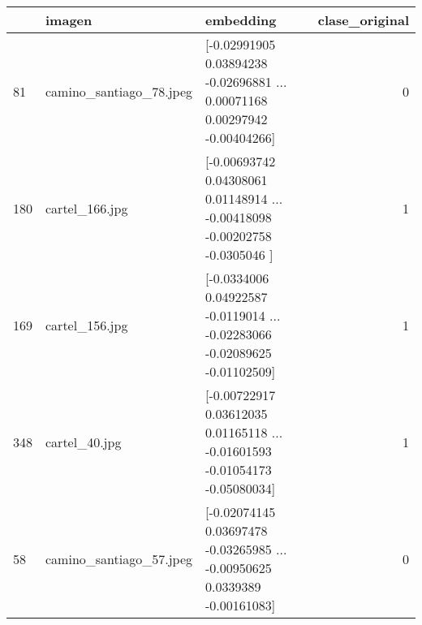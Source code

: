 \begin{tabular}{lllr}
\toprule
 & imagen & embedding & clase\_original \\
\midrule
81 & camino\_santiago\_78.jpeg & [-0.02991905  0.03894238 -0.02696881 ...  0.00071168  0.00297942
 -0.00404266] & 0 \\
180 & cartel\_166.jpg & [-0.00693742  0.04308061  0.01148914 ... -0.00418098 -0.00202758
 -0.0305046 ] & 1 \\
169 & cartel\_156.jpg & [-0.0334006   0.04922587 -0.0119014  ... -0.02283066 -0.02089625
 -0.01102509] & 1 \\
348 & cartel\_40.jpg & [-0.00722917  0.03612035  0.01165118 ... -0.01601593 -0.01054173
 -0.05080034] & 1 \\
58 & camino\_santiago\_57.jpeg & [-0.02074145  0.03697478 -0.03265985 ... -0.00950625  0.0339389
 -0.00161083] & 0 \\
\bottomrule
\end{tabular}

